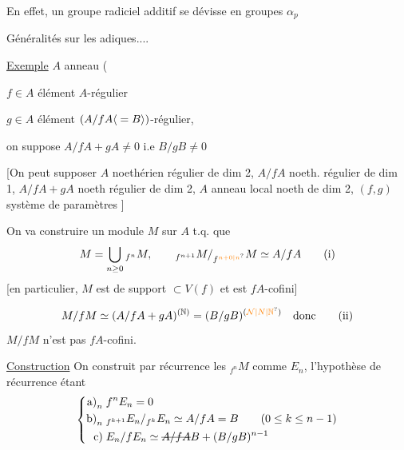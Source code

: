 En effet, un groupe radiciel additif se dévisse en groupes $\alpha_p$ 

Généralités sur les  adiques....


\uline{Exemple} \qquad $A$ anneau (

$f\in A$ élément $A$-régulier

$g\in A$ élément $(A/fA\inserted{{}=B})$-régulier, 

on suppose $A/fA+gA\neq 0$ i.e $B/gB\neq 0$

[On peut supposer $A$ noethérien régulier de dim 2, $A/fA$ noeth. régulier de dim 1, $A/fA+gA$ noeth régulier de dim 2,  $A$ anneau local noeth de dim 2, $(f,g)$ système de paramètres ]

On va construire un module $M$ sur $A$ t.q. que
\[
M=\bigcup_{n\geq 0}{}_{f^n}M,\qquad {}_{f^{n+1}}M/{}_{f^{\unsure{n+0|n}}}M\simeq A/fA \tag*{(i)}
\]
[en particulier, $M$ est de support $\subset V(f)$ et est $fA$-cofini]

\[
M/fM\simeq(A/fA+gA)^{(\mathbb N)}=(B/gB)^{(\unsure{\mathcal N|N|\mathbb{N}})}\quad\text{donc}\tag*{(ii)}
\]
$M/fM$ n'est pas $fA$-cofini.

\uline{Construction} On construit par récurrence les $ {}_{f^n}M$ comme $E_n$, l'hypothèse de récurrence étant
\[
\left\{\begin{aligned}
\mathrm{a)}_n\;&f^nE_n=0\\
\mathrm{b)}_n\;&{}_{f^{k+1}}E_n/{}_{f^k}E_n\simeq A/fA=B\qquad(0\leq k\leq n-1)\\
\mathrm{c)}\;&E_n/fE_n\simeq\deleted{A/fA} B+(B/gB)^{n-1}
\end{aligned}\right.
\]

